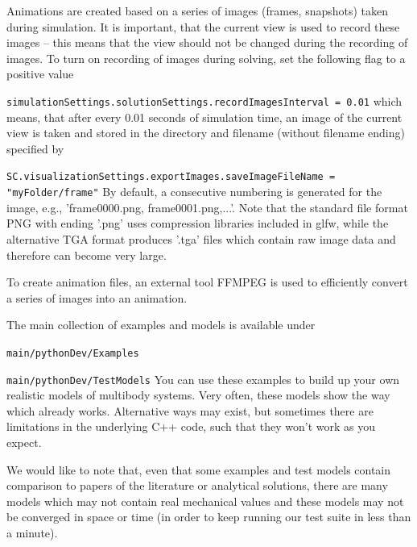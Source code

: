 Animations are created based on a series of images (frames, snapshots) taken during simulation. It is important, that the current view is used to record these images -- this means that the view should not be changed during the recording of images.
To turn on recording of images during solving, set the following flag to a positive value
\bi
  \item \texttt{simulationSettings.solutionSettings.recordImagesInterval = 0.01}
\ei
which means, that after every 0.01 seconds of simulation time, an image of the current view is taken and stored in the directory and filename (without filename ending) specified by 
\bi
  \item \texttt{SC.visualizationSettings.exportImages.saveImageFileName = "myFolder/frame"}
\ei
By default, a consecutive numbering is generated for the image, e.g., 'frame0000.png, frame0001.png,...'. Note that the standard file format PNG with ending '.png' uses compression libraries included in glfw, while the alternative TGA format produces '.tga' files which contain raw image data and therefore can become very large.

To create animation files, an external tool FFMPEG is used to efficiently convert a series of images into an animation.

\label{secExamplesTestModels}

The main collection of examples and models is available under
\bi
  \item \texttt{main/pythonDev/Examples}
  \item \texttt{main/pythonDev/TestModels}
\ei
You can use these examples to build up your own realistic models of multibody systems.
Very often, these models show the way which already works. Alternative ways may exist, but
sometimes there are limitations in the underlying C++ code, such that they won't work as you expect.

We would like to note that, even that some examples and test models contain comparison to 
papers of the literature or analytical solutions, there are many models which may not contain real
mechanical values and these models may not be converged in space or time 
(in order to keep running our test suite in less than a minute).

